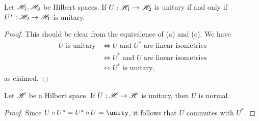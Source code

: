 \begin{corollary}
    Let \(\mathscr{H}_1, \mathscr{H}_2\) be Hilbert spaces. If \(U : \mathscr{H}_1 \to \mathscr{H}_2\) is unitary if and only if \(U^* : \mathscr{H}_2 \to \mathscr{H}_1\) is unitary.
\end{corollary}
\begin{proof}
    This should be clear from the equivalence of (a) and (c). We have
    \begin{align*}
        U \text{ is unitary} &\iff U\text{ and }U^*\text{ are linear isometries} \\
                             &\iff U^*\text{ and }U\text{ are linear isometries}\\
                             &\iff U^*\text{ is unitary},
    \end{align*}
    as claimed.
\end{proof}
\begin{corollary}
    Let \(\mathscr{H}\) be a Hilbert space. If \(U : \mathscr{H} \to \mathscr{H}\) is unitary, then \(U\) is normal.
\end{corollary}
\begin{proof}
    Since \(U \circ U^* = U^* \circ U = \unity\), it follows that \(U\) commutes with \(U^*\).
\end{proof}

